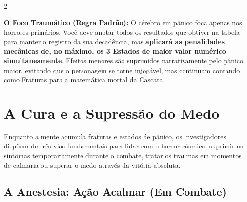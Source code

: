 \documentclass[a4paper,11pt,openany]{book}
\begin{document}
\begin{multicols}{2}
\begin{regra}
\textbf{O Foco Traumático (Regra Padrão):} O cérebro em pânico foca apenas nos horrores primários. Você deve anotar todos os resultados que obtiver na tabela para manter o registro da sua decadência, mas \textbf{aplicará as penalidades mecânicas de, no máximo, os 3 Estados de maior valor numérico simultaneamente}. Efeitos menores são suprimidos narrativamente pelo pânico maior, evitando que o personagem se torne injogável, mas continuam contando como Fraturas para a matemática mortal da Cascata.
\end{regra}





\section{A Cura e a Supressão do Medo}

Enquanto a mente acumula fraturas e estados de pânico, os investigadores dispõem de três vias fundamentais para lidar com o horror cósmico: suprimir os sintomas temporariamente durante o combate, tratar os traumas em momentos de calmaria ou superar o medo através da vitória absoluta.

\subsection{A Anestesia: Ação Acalmar (Em Combate)}


\end{multicols}
\end{document}
